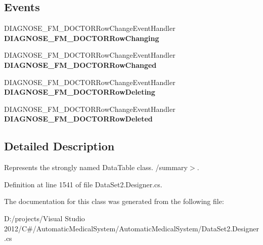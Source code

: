 \subsection*{Events}
\begin{CompactItemize}
\item 
DIAGNOSE\_\-FM\_\-DOCTORRowChangeEventHandler \textbf{DIAGNOSE\_\-FM\_\-DOCTORRowChanging}\label{class_automatic_medical_system_1_1_data_set2_1_1_d_i_a_g_n_o_s_e___f_m___d_o_c_t_o_r_data_table_5b3b9db0eddf086dc0e35aa4271ea5b3}

\item 
DIAGNOSE\_\-FM\_\-DOCTORRowChangeEventHandler \textbf{DIAGNOSE\_\-FM\_\-DOCTORRowChanged}\label{class_automatic_medical_system_1_1_data_set2_1_1_d_i_a_g_n_o_s_e___f_m___d_o_c_t_o_r_data_table_75297fca2524ac8201206cc7e29ea841}

\item 
DIAGNOSE\_\-FM\_\-DOCTORRowChangeEventHandler \textbf{DIAGNOSE\_\-FM\_\-DOCTORRowDeleting}\label{class_automatic_medical_system_1_1_data_set2_1_1_d_i_a_g_n_o_s_e___f_m___d_o_c_t_o_r_data_table_f8a101faba77bea5e6cec90a22fcd6aa}

\item 
DIAGNOSE\_\-FM\_\-DOCTORRowChangeEventHandler \textbf{DIAGNOSE\_\-FM\_\-DOCTORRowDeleted}\label{class_automatic_medical_system_1_1_data_set2_1_1_d_i_a_g_n_o_s_e___f_m___d_o_c_t_o_r_data_table_a9874574c327508f813023af1e1821fb}

\end{CompactItemize}


\subsection{Detailed Description}
Represents the strongly named DataTable class. /summary$>$. 

Definition at line 1541 of file DataSet2.Designer.cs.

The documentation for this class was generated from the following file:\begin{CompactItemize}
\item 
D:/projects/Visual Studio 2012/C\#/AutomaticMedicalSystem/AutomaticMedicalSystem/DataSet2.Designer.cs\end{CompactItemize}
